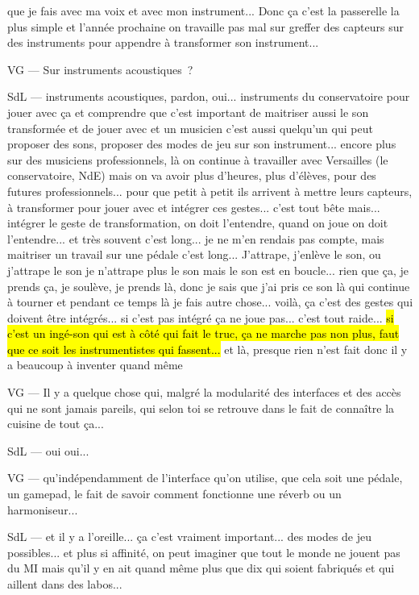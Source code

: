 que je fais avec ma voix et avec mon instrument... Donc ça c'est la passerelle la plus simple et l'année prochaine on travaille pas mal sur greffer des capteurs sur des instruments pour appendre à transformer son instrument... 

VG — Sur instruments acoustiques ? 

SdL — instruments acoustiques, pardon, oui... instruments du conservatoire pour jouer avec ça et comprendre que c'est important de maitriser aussi le son transformée et de jouer avec et un musicien c'est aussi quelqu'un qui peut proposer des sons, proposer des modes de jeu sur son instrument... encore plus sur des musiciens professionnels, là on continue à travailler avec Versailles (le conservatoire, NdE) mais on va avoir plus d'heures, plus d'élèves, pour des futures professionnels... pour que petit à petit ils arrivent à mettre leurs capteurs, à transformer pour jouer avec et intégrer ces gestes... c'est tout bête mais... intégrer le geste de transformation, on doit l'entendre, quand on joue on doit l'entendre... et très souvent c'est long... je ne m'en rendais pas compte, mais maitriser un travail sur une pédale c'est long... J'attrape, j'enlève le son, ou j'attrape le son je n'attrape plus le son mais le son est en boucle... rien que ça, je prends ça, je soulève, je prends là, donc je sais que j'ai pris ce son là qui continue à tourner et pendant ce temps là je fais autre chose... voilà, ça c'est des gestes qui doivent être intégrés... si c'est pas intégré ça ne joue pas... c'est tout raide... \hl{si c'est un ingé-son qui est à côté qui fait le truc, ça ne marche pas non plus, faut que ce soit les instrumentistes qui fassent...} et là, presque rien n'est fait donc il y a beaucoup à inventer quand même  

VG — Il y a quelque chose qui, malgré la modularité des interfaces et des accès qui ne sont jamais pareils, qui selon toi se retrouve dans le fait de connaître la cuisine de tout ça... 

SdL — oui oui... 

VG — qu'indépendamment de l'interface qu'on utilise, que cela soit une pédale, un gamepad, le fait de savoir comment fonctionne une réverb ou un harmoniseur... 

SdL — et il y a l'oreille... ça c'est vraiment important... des modes de jeu possibles... et plus si affinité, on peut imaginer que tout le monde ne jouent pas du MI mais qu'il y en ait quand même plus que dix qui soient fabriqués et qui aillent dans des labos... 

